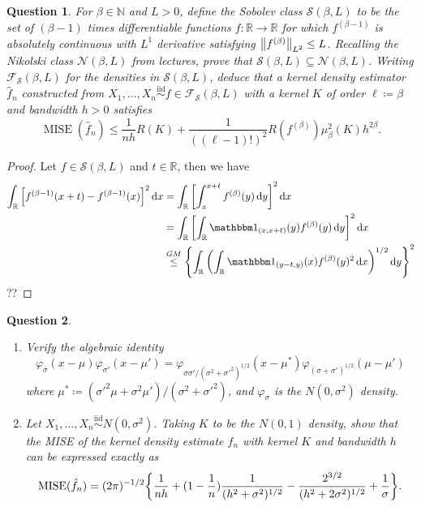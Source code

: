 \documentclass{article}
\theoremstyle{plain}
\newtheorem{question}{Question}
\theoremstyle{remark}
\renewcommand{\phi}{\varphi}
\newcommand{\Bb}{\mathbb}
\newcommand{\Cal}{\mathcal}
\newcommand{\Rm}{\mathrm}
\newcommand{\NN}{\Bb N}
\newcommand{\RR}{\Bb R}
\newcommand\FF{\Cal F}
\newcommand\Nn{\Cal N}
\renewcommand\SS{\Cal S}
\newcommand\ceq\coloneqq %
\newcommand\ind{\mathbbm 1} %
\newcommand\iid{\overset{\Rm{iid}}{\sim}}
\DeclareMathOperator\MISE{MISE}
\begin{document}
\begin{question}
	For $\beta \in \NN$ and $L > 0$, define the \emph{Sobolev class} $\SS(\beta, L)$ to be the set of $(\beta - 1)$ times differentiable functions $f \colon \RR \to \RR$ for which $f^{(\beta - 1)}$ is absolutely continuous with $L^1$ derivative satisfying $\norm{f^{(\beta)}}_{L^2} \leq L$. Recalling the Nikolski class $\Nn(\beta, L)$ from lectures, prove that $\SS(\beta, L) \subseteq \Nn(\beta, L)$. Writing $\FF_\SS(\beta, L)$ for the densities in $\SS(\beta, L)$, deduce that a kernel density estimator $\hat f_n$ constructed from $X_1, \dotsc, X_n \iid f \in \FF_\SS(\beta, L)$ with a kernel $K$ of order $\ell \ceq \beta$ and bandwidth $h > 0$ satisfies
	\[
	\MISE(\hat f_n) \leq \frac1{nh} R(K) + \frac1{((\ell - 1)!)^2} R(f^{(\beta)}) \mu_\beta^2(K) h^{2\beta}. 
	\]
\end{question}

\begin{proof}
	Let $f \in \SS(\beta, L)$ and $t \in \RR$, then we have 
	\begin{align*}
		\int_\RR \qty[f^{(\beta - 1)}(x + t) - f^{(\beta - 1)}(x)]^2 \dd{x} &= \int_\RR \qty[\int_x^{x+t} f^{(\beta)}(y) \dd{y}]^2 \dd{x} \\
		&= \int_\RR \qty[ \int_\RR \ind_{(x, x+t)}(y) f^{(\beta)}(y) \dd{y} ]^2 \dd{x} \\
		&\overset{GM}\leq  \qty{ \int_\RR \qty( \int_\RR \ind_{(y-t, y)}(x) f^{(\beta)}(y)^2 \dd{x})^{1/2} \dd{y}}^2 
	\end{align*}
??
\end{proof}

\begin{question}
	\begin{enumerate}
		\item 	Verify the algebraic identity
		\[
		\phi_\sigma(x-\mu)\phi_{\sigma'}(x-\mu') = \phi_{\sigma\sigma'/(\sigma^2 + \sigma'^2)^{1/2}}(x - \mu^*) \phi_{(\sigma + \sigma')^{1/2}}(\mu - \mu')
		\]
		where $\mu^* \ceq (\sigma'^2 \mu + \sigma^2\mu') / (\sigma^2 + \sigma'^2)$, and $\phi_\sigma$ is the $N(0, \sigma^2)$ density. 
		
		\item Let $X_1, \dotsc, X_n \iid N(0, \sigma^2)$. Taking $K$ to be the $N(0, 1)$ density, show that the MISE of the kernel density estimate $\hat f_n$ with kernel $K$ and bandwidth $h$ can be expressed exactly as
		\[
		\MISE(\hat f_n) = (2\pi)^{-1/2} \qty{\frac1{nh} + (1 - \frac1n) \frac{1}{(h^2 + \sigma^2)^{1/2}} - \frac{2^{3/2}}{(h^2 + 2\sigma^2)^{1/2}} + \frac1\sigma}. 
		\]
	\end{enumerate}

\end{question}
\end{document}
